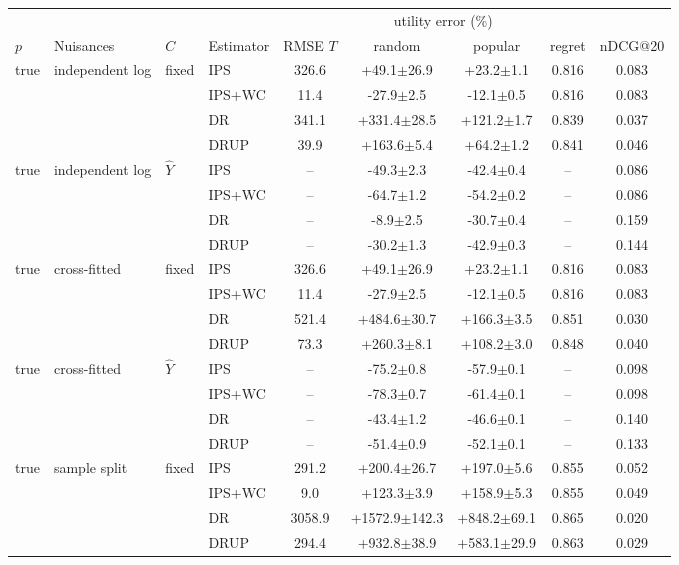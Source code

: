 \begin{tabular}{llllccccc}
\toprule
 & & & & & \multicolumn{2}{c}{utility error (\%)} & & \\
$p$ & Nuisances & $C$ & Estimator & RMSE $T$ & random & popular & regret & nDCG@20\\
\midrule
true & independent log & fixed & IPS & 326.6 & +49.1$\pm$26.9 & +23.2$\pm$1.1 & 0.816 & 0.083\\
 &  &  & IPS+WC & 11.4 & -27.9$\pm$2.5 & -12.1$\pm$0.5 & 0.816 & 0.083\\
 &  &  & DR & 341.1 & +331.4$\pm$28.5 & +121.2$\pm$1.7 & 0.839 & 0.037\\
 &  &  & DRUP & 39.9 & +163.6$\pm$5.4 & +64.2$\pm$1.2 & 0.841 & 0.046\\
\midrule
true & independent log & $\hat Y$ & IPS & -- & -49.3$\pm$2.3 & -42.4$\pm$0.4 & -- & 0.086\\
 &  &  & IPS+WC & -- & -64.7$\pm$1.2 & -54.2$\pm$0.2 & -- & 0.086\\
 &  &  & DR & -- & -8.9$\pm$2.5 & -30.7$\pm$0.4 & -- & 0.159\\
 &  &  & DRUP & -- & -30.2$\pm$1.3 & -42.9$\pm$0.3 & -- & 0.144\\
\midrule
true & cross-fitted & fixed & IPS & 326.6 & +49.1$\pm$26.9 & +23.2$\pm$1.1 & 0.816 & 0.083\\
 &  &  & IPS+WC & 11.4 & -27.9$\pm$2.5 & -12.1$\pm$0.5 & 0.816 & 0.083\\
 &  &  & DR & 521.4 & +484.6$\pm$30.7 & +166.3$\pm$3.5 & 0.851 & 0.030\\
 &  &  & DRUP & 73.3 & +260.3$\pm$8.1 & +108.2$\pm$3.0 & 0.848 & 0.040\\
\midrule
true & cross-fitted & $\hat Y$ & IPS & -- & -75.2$\pm$0.8 & -57.9$\pm$0.1 & -- & 0.098\\
 &  &  & IPS+WC & -- & -78.3$\pm$0.7 & -61.4$\pm$0.1 & -- & 0.098\\
 &  &  & DR & -- & -43.4$\pm$1.2 & -46.6$\pm$0.1 & -- & 0.140\\
 &  &  & DRUP & -- & -51.4$\pm$0.9 & -52.1$\pm$0.1 & -- & 0.133\\
\midrule
true & sample split & fixed & IPS & 291.2 & +200.4$\pm$26.7 & +197.0$\pm$5.6 & 0.855 & 0.052\\
 &  &  & IPS+WC & 9.0 & +123.3$\pm$3.9 & +158.9$\pm$5.3 & 0.855 & 0.049\\
 &  &  & DR & 3058.9 & +1572.9$\pm$142.3 & +848.2$\pm$69.1 & 0.865 & 0.020\\
 &  &  & DRUP & 294.4 & +932.8$\pm$38.9 & +583.1$\pm$29.9 & 0.863 & 0.029\\

\end{tabular}
